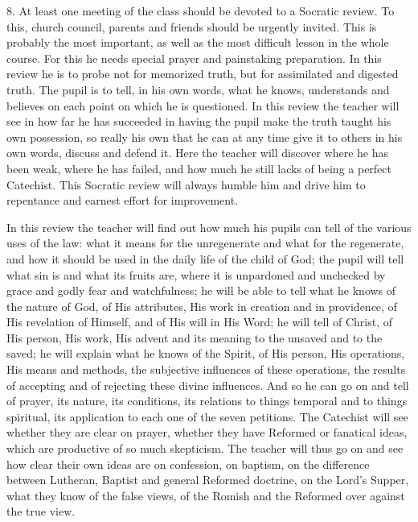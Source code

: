8.  At least one meeting of the class should be devoted to a Socratic review. To this, church council, parents and friends should be urgently invited. This is probably the most important, as well as the most difficult lesson in the whole course. For this he needs special prayer and painstaking preparation. In this review he is to probe not for memorized truth, but for assimilated and digested truth. The pupil is to tell, in his own words, what he knows,
understands and believes on each point on which he is questioned. In this review the teacher will see in how far he has succeeded in having the pupil make the truth taught his own possession, so really his own that he can at any time give it to others in his own words, discuss and defend it. Here the teacher will discover where he has been weak, where he has failed, and how much he still lacks of being a perfect Catechist. This Socratic review will always humble him and drive him to repentance and earnest effort for improvement.

In this review the teacher will find out how much his pupils can tell of the various uses of the law: what it means for the unregenerate and what for the regenerate, and how it should be used in the daily life of the child of God; the pupil will tell what sin is and what its fruits are, where it is unpardoned and unchecked by grace and godly fear and watchfulness; he will be able to tell what he knows of the nature of God, of His attributes, His work in creation and in providence, of His revelation of Himself, and of His will in His Word; he will tell of Christ, of His person, His work, His advent and its meaning to the unsaved and to the saved; he will explain what he knows of the Spirit, of His person, His operations, His means and methods, the subjective influences of these operations, the results of
accepting and of rejecting these divine influences. And so he can go on and tell of prayer, its nature, its conditions, its relations to things temporal and to things spiritual, its application to each one of the seven petitions. The Catechist will see whether they are clear on prayer, whether they have Reformed or fanatical ideas, which are productive of so much skepticism. The teacher will thus go on and see how clear their own ideas are on confession, on baptism, on the difference between Lutheran, Baptist and general Reformed doctrine, on the Lord’s Supper, what they know of the false views, of the Romish and the Reformed over against the true view.

